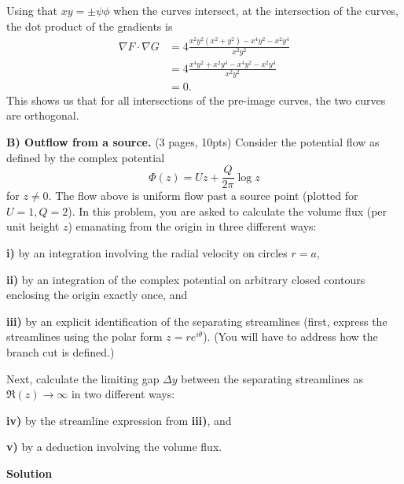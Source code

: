 \documentclass{article}
\begin{document}
%
Using that $x y = \pm \psi \phi$ when the curves intersect, at the
intersection of the curves, the dot product of the gradients is
%
\begin{align*}
    \nabla F \cdot \nabla G
        &= 4 \frac{x^2 y^2 (x^2 + y^2) - x^4 y^2 - x^2 y^4}{x^2 y^2} \\
        &= 4 \frac{x^4 y^2 + x^2 y^4 - x^4 y^2 - x^2 y^4}{x^2 y^2} \\
        &= 0
        .
\end{align*}
%
This shows us that for all intersections of the pre-image curves, the
two curves are orthogonal.

\newpage

\textbf{B) Outflow from a source.} (3 pages, 10pts) Consider the
potential flow as defined by the complex potential
%
\begin{equation*}
    \Phi(z) = U z + \frac{Q}{2 \pi} \log z
\end{equation*}
%
for $z \neq 0$. The flow above is uniform flow past a source point
(plotted for $U = 1, Q= 2$). In this problem, you are asked to calculate
the volume flux (per unit height $z$) emanating from the origin in three
different ways:

\textbf{i)} by an integration involving the radial velocity on circles
$r = a$,

\textbf{ii)} by an integration of the complex potential on arbitrary
closed contours enclosing the origin exactly once, and

\textbf{iii)} by an explicit identification of the separating
streamlines (first, express the streamlines using the polar form $z = r
e^{i \theta}$). (You will have to address how the branch cut is
defined.)

Next, calculate the limiting gap $\Delta y$ between the separating
streamlines as $\Re(z) \to \infty$ in two different ways:

\textbf{iv)} by the streamline expression from \textbf{iii)}, and

\textbf{v)} by a deduction involving the volume flux.

\newpage

\textbf{Solution}
\end{document}
